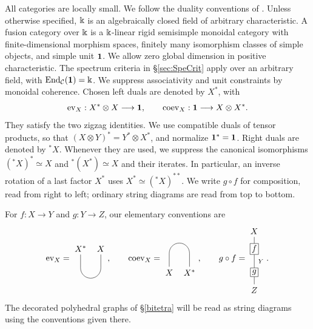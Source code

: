\documentclass{amsart}
\begin{document}
All categories are locally small. We follow the duality conventions of
\cite[Chapters~2 and~4]{EGNO15}. Unless otherwise specified, $\Bbbk$ is an
algebraically closed field of arbitrary characteristic. A fusion category over
$\Bbbk$ is a $\Bbbk$-linear rigid semisimple monoidal category with
finite-dimensional morphism spaces, finitely many isomorphism classes of simple
objects, and simple unit ${\bf 1}$. We allow zero global dimension in positive
characteristic. The spectrum criteria in \S\ref{sec:SpeCrit} apply over an
arbitrary field, with $\mathrm{End}_{\mathcal{C}}({\bf 1})=\Bbbk$. We suppress associativity and unit constraints by monoidal
coherence. Chosen left duals are denoted by $X^*$, with
\[
 \mathrm{ev}_X:X^*\otimes X\longrightarrow{\bf 1},
 \qquad \mathrm{coev}_X:{\bf 1}\longrightarrow X\otimes X^*.
\]
They satisfy the two zigzag identities. We use compatible duals of tensor products,
so that $(X\otimes Y)^*=Y^*\otimes X^*$, and normalize ${\bf 1}^*={\bf 1}$.
Right duals are denoted by ${}^*X$. Whenever they are used, we suppress the canonical
isomorphisms $({}^*X)^*\simeq X$ and $ {}^*(X^*)\simeq X$ and their iterates.
In particular, an inverse rotation of a last factor $X^*$ uses
$X^*\simeq({}^*X)^{**}$. We write $g\circ f$ for composition,
read from right to left; ordinary string diagrams are read from top to bottom.

For $f:X\to Y$ and $g:Y\to Z$, our elementary conventions are
\[
\ev_X=
\begin{tikzpicture}[baseline=(current bounding box.center),scale=.7]
\draw (0,.8) node[above] {$X^*$} -- (0,0) arc(180:360:.6) -- (1.2,.8) node[above] {$X$};
\end{tikzpicture},\qquad
\coev_X=
\begin{tikzpicture}[baseline=(current bounding box.center),scale=.7]
\draw (0,-.8) node[below] {$X$} -- (0,0) arc(180:0:.6) -- (1.2,-.8) node[below] {$X^*$};
\end{tikzpicture},\qquad
 g\circ f=
\begin{tikzpicture}[baseline=(current bounding box.center),scale=.7]
\node[draw,fill=white,inner sep=2pt] (first) at (0,.69) {$f$};
\node[draw,fill=white,inner sep=2pt] (last) at (0,-.69) {$g$};
\draw (0,1.40) node[above] {$X$} -- (first.north);
\draw (first.south) -- node[midway,right=1pt,font=\scriptsize] {$Y$} (last.north);
\draw (last.south) -- (0,-1.40) node[below] {$Z$};
\end{tikzpicture}.
\]
The decorated polyhedral graphs of \S\ref{bitetra} will be read as string
diagrams using the conventions given there.
\end{document}
